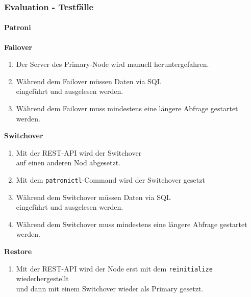 
\begin{flushleft}
    \subsubsection{Evaluation - Testfälle}
    \paragraph{Patroni}
    \begin{description}
        \item \textbf{Failover}\hfill \\
        \begin{enumerate}
            \item Der Server des Primary-Node wird manuell heruntergefahren.
            \item Während dem Failover müssen Daten via SQL\\eingeführt und ausgelesen werden.
            \item Während dem Failover muss mindestens eine längere Abfrage gestartet werden.
        \end{enumerate}
        \item \textbf{Switchover}\hfill \\
        \begin{enumerate}[resume]
            \item Mit der REST-API wird der Switchover\\auf einen anderen Nod abgesetzt.
            \item Mit dem \texttt{patronictl}-Command wird der Switchover gesetzt
            \item Während dem Switchover müssen Daten via SQL\\eingeführt und ausgelesen werden.
            \item Während dem Switchover muss mindestens eine längere Abfrage gestartet werden.
        \end{enumerate}
        \item \textbf{Restore}\hfill \\
        \begin{enumerate}[resume]
            \item Mit der REST-API wird der Node erst mit dem \texttt{reinitialize} wiederhergestellt\\und dann mit einem Switchover wieder als Primary gesetzt.

\end{enumerate}
\end{description}
\end{flushleft}
